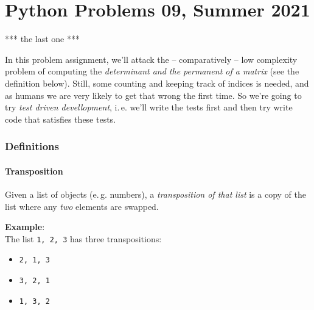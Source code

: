 \documentclass[
	english,
	fontsize=10pt,
	parskip=half,
	titlepage=true,
	DIV=12
]{scrartcl}
\newcommand*{\ie}{i.\,e.\xspace}
\newcommand*{\eg}{e.\,g.\xspace}
\begin{document}
\part*{Python Problems 09, Summer 2021}
\begin{center}
\begin{Large}
*** the last one ***
\end{Large}
\end{center}

In this problem assignment, we'll attack the -- comparatively -- low complexity problem of computing the \emph{determinant and the permanent of a matrix} (see the definition below). Still, some counting and keeping track of indices is needed, and as humans we are very likely to get that wrong the first time. So we're going to try \emph{test driven devellopment}, \ie we'll write the tests first and then try write code that satisfies these tests.

\section{Definitions}
\subsection{Transposition}
Given a list of objects (\eg numbers), a \emph{transposition of that list} is a copy of the list where any \emph{two} elements are swapped.

\textbf{Example}:\\
The list \texttt{1, 2, 3} has three transpositions:

\begin{minipage}{.25\linewidth}
	\begin{itemize}
	\item \texttt{2, 1, 3}
	\end{itemize}
\end{minipage}
%
\begin{minipage}{.25\linewidth}
	\begin{itemize}
	\item \texttt{3, 2, 1}
	\end{itemize}
\end{minipage}
%
\begin{minipage}{.25\linewidth}
	\begin{itemize}
	\item \texttt{1, 3, 2}
	\end{itemize}
\end{minipage}
\end{document}
